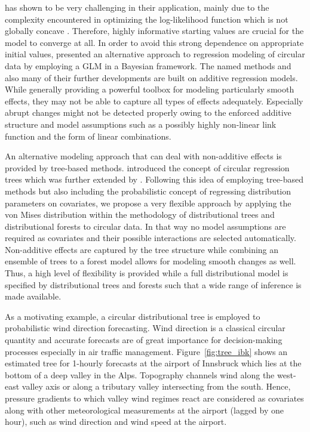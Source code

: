 \documentclass[nojss]{jss}
\numberwithin{equation}{section}
\begin{document}
has shown to be very challenging in their application, mainly due to the 
complexity encountered in optimizing the log-likelihood function which is not globally concave 
\citep{Pewsey+Neuhaeuser+Ruxton:2013, Gill+Hangartner:2010}. Therefore, 
highly informative starting values are crucial for the model to converge at all.
In order to avoid this strong dependence on appropriate initial values, \cite{Mulder+Klugkist:2017} presented an alternative approach to regression modeling of circular data by employing a GLM 
in a Bayesian framework. 
The named methods and also many of their further developments \citep[see,
e.g.,][]{Jammalamadaka+Sengupta:2001} are built on additive regression models.
While generally providing a powerful toolbox for modeling particularly smooth
effects, they may not be able to capture all types of effects adequately.
Especially abrupt changes might not be detected properly owing to the enforced
additive structure and model assumptions such as a possibly highly non-linear link function and
the form of linear combinations.

An alternative modeling approach that can deal with non-additive effects is provided
by tree-based methods. \cite{Lund:2002} introduced the concept of circular regression trees 
which was further extended by \cite{Larraondo+Inza+Lozano:2018}. 
Following this idea of employing tree-based methods but also including the probabilistic concept
of regressing distribution parameters on covariates, we propose a very flexible approach 
by applying the von Mises distribution within the methodology of distributional trees and 
distributional forests \citep{Schlosser+Hothorn+Stauffer:2019} to circular data.
In that way no model assumptions are required as covariates and their possible interactions are
selected automatically. Non-additive effects are captured by the tree structure while combining an 
ensemble of trees to a forest model allows for modeling smooth changes as well. 
Thus, a high level of flexibility is provided while a full distributional model is specified 
by distributional trees and forests such that a wide range of inference is made available.

As a motivating example, a circular distributional tree is employed to
probabilistic wind direction forecasting. Wind direction is a classical
circular quantity and accurate forecasts are of great importance for
decision-making processes especially in air traffic management.
Figure~\ref{fig:tree_ibk} shows an estimated tree for 1-hourly forecasts at
the airport of Innsbruck which lies at the bottom of a deep valley in the Alps.
Topography channels wind along the west-east valley axis or along a tributary
valley intersecting from the south. Hence, pressure gradients to which valley
wind regimes react are considered as covariates along with other meteorological
measurements at the airport (lagged by one hour), such as wind direction and
wind speed at the airport.
\end{document}
